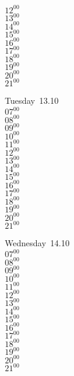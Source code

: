 \documentclass[11pt,a4paper]{book}\usepackage[]{graphicx}\usepackage[]{color}
\begin{document}
{{{{{{{{{{{{{{\begin{tcolorbox}
{$12^{00}$\\
$13^{00}$\\
$14^{00}$\\
$15^{00}$\\
$16^{00}$\\
$17^{00}$\\
$18^{00}$\\
$19^{00}$\\
$20^{00}$\\
$21^{00}$}\\
\end{tcolorbox}
%
\begin{tcolorbox}
Tuesday~13.10\\
{ 
$07^{00}$\\
$08^{00}$\\
$09^{00}$\\
$10^{00}$\\
$11^{00}$\\
$12^{00}$\\
$13^{00}$\\
$14^{00}$\\
$15^{00}$\\
$16^{00}$\\
$17^{00}$\\
$18^{00}$\\
$19^{00}$\\
$20^{00}$\\
$21^{00}$}\\
\end{tcolorbox}
%
\begin{tcolorbox}
Wednesday~14.10\\
{ 
$07^{00}$\\
$08^{00}$\\
$09^{00}$\\
$10^{00}$\\
$11^{00}$\\
$12^{00}$\\
$13^{00}$\\
$14^{00}$\\
$15^{00}$\\
$16^{00}$\\
$17^{00}$\\
$18^{00}$\\
$19^{00}$\\
$20^{00}$\\
$21^{00}$}\\
\end{tcolorbox}
\clearpage
%
}}}}}}}}}}}}}}
\end{document}
